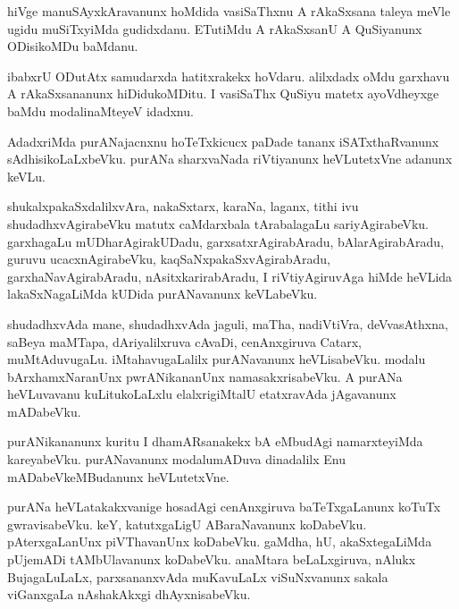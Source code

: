\documentclass{article}
\begin{document}
\begin{mn}
hiVge  manuSAyxkAravanunx  hoMdida  vasiSaThxnu  A  rAkaSxsana  taleya  meVle  ugidu  muSiTxyiMda  
gudidxdanu.  ETutiMdu  A  rAkaSxsanU  A  QuSiyanunx  ODisikoMDu  baMdanu.
\end{mn}

\begin{mn}
ibabxrU  ODutAtx  samudarxda  hatitxrakekx  hoVdaru.  alilxdadx  oMdu  garxhavu  A  rAkaSxsananunx  
hiDidukoMDitu.  I  vasiSaThx QuSiyu  matetx  ayoVdheyxge  baMdu  modalinaMteyeV  idadxnu.
\end{mn}

\begin{mn}
AdadxriMda  purANajacnxnu  hoTeTxkicucx  paDade  tananx  iSATxthaRvanunx  sAdhisikoLaLxbeVku.  
purANa sharxvaNada  riVtiyanunx  heVLutetxVne  adanunx  keVLu.
\end{mn}

\begin{mn}
shukalxpakaSxdalilxvAra,  nakaSxtarx,  karaNa,  laganx,  tithi  ivu  shudadhxvAgirabeVku  matutx  
caMdarxbala  tArabalagaLu  sariyAgirabeVku.  garxhagaLu  mUDharAgirakUDadu,  garxsatxrAgirabAradu,  
bAlarAgirabAradu,  guruvu  ucacxnAgirabeVku,  kaqSaNxpakaSxvAgirabAradu,  garxhaNavAgirabAradu,  
nAsitxkarirabAradu,  I  riVtiyAgiruvAga  hiMde  heVLida  lakaSxNagaLiMda  kUDida  purANavanunx  keVLabeVku.
\end{mn}

\begin{mn}
shudadhxvAda  mane,  shudadhxvAda  jaguli,  maTha,  nadiVtiVra,  deVvasAthxna,  saBeya  maMTapa,  
dAriyalilxruva  cAvaDi,  cenAnxgiruva  Catarx,  muMtAduvugaLu.  iMtahavugaLalilx  purANavanunx  
heVLisabeVku.  modalu  bArxhamxNaranUnx  pwrANikananUnx  namasakxrisabeVku.  A  purANa  heVLuvavanu  
kuLitukoLaLxlu  elalxrigiMtalU  etatxravAda  jAgavanunx  mADabeVku.
\end{mn}

\begin{mn}
purANikananunx  kuritu  I  dhamARsanakekx  bA  eMbudAgi  namarxteyiMda  kareyabeVku.  purANavanunx  
modalumADuva  dinadalilx  Enu  mADabeVkeMBudanunx  heVLutetxVne.
\end{mn}

\begin{mn}
purANa  heVLatakakxvanige  hosadAgi  cenAnxgiruva  baTeTxgaLanunx  koTuTx  gwravisabeVku.  keY, katutxgaLigU  
ABaraNavanunx  koDabeVku.  pAterxgaLanUnx  piVThavanUnx  koDabeVku.  gaMdha,  hU,  akaSxtegaLiMda  pUjemADi  
tAMbUlavanunx  koDabeVku.  anaMtara  beLaLxgiruva,  nAlukx  BujagaLuLaLx,  parxsananxvAda  muKavuLaLx  
viSuNxvanunx  sakala  viGanxgaLa  nAshakAkxgi  dhAyxnisabeVku.
\end{mn}
\end{document}
